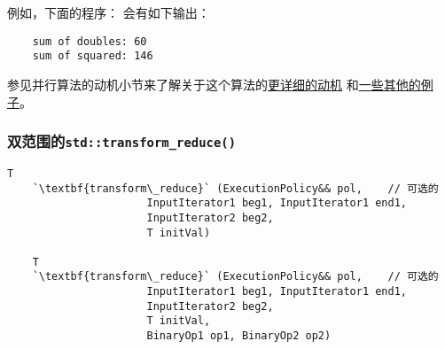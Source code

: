 例如，下面的程序：
会有如下输出：
\begin{lstlisting}
    sum of doubles: 60
    sum of squared: 146
\end{lstlisting}
参见并行算法的动机小节来了解关于这个算法的\hyperref[transform动机]{更详细的动机}
和\hyperref[ch22.6.1.4]{一些其他的例子}。

\subsubsection{双范围的\texttt{std::transform\_reduce()}}\label{ch23.2.2.2}
\begin{lstlisting}[frame=single,xleftmargin=13pt,xrightmargin=13pt]
    T
    `\textbf{transform\_reduce}` (ExecutionPolicy&& pol,    // 可选的
                      InputIterator1 beg1, InputIterator1 end1,
                      InputIterator2 beg2,
                      T initVal)

    T
    `\textbf{transform\_reduce}` (ExecutionPolicy&& pol,    // 可选的
                      InputIterator1 beg1, InputIterator1 end1,
                      InputIterator2 beg2,
                      T initVal,
                      BinaryOp1 op1, BinaryOp2 op2)
\end{lstlisting}

